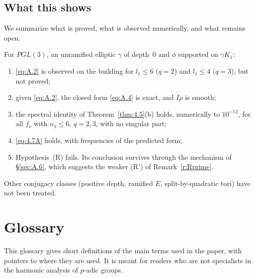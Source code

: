 \documentclass[12pt,letterpaper]{article}
\numberwithin{equation}{section}
\theoremstyle{plain}
\theoremstyle{remark}
\theoremstyle{plain}
\theoremstyle{definition}
\theoremstyle{remark}
\theoremstyle{remark}
\begin{document}
\subsection{What this shows}\label{sec:A.7}

We summarize what is proved, what is observed numerically, and what remains open.


For $PGL(3)$, an unramified elliptic $\gamma$ of depth~$0$ and $\phi$ supported on $\gamma K_1$:
\begin{enumerate}
\item \eqref{eq:A.2} is observed on the building for $l_1\le6$ ($q=2$) and $l_1\le4$ ($q=3$), but not proved;
\item given \eqref{eq:A.2}, the closed form \eqref{eq:A.4} is exact, and $I\rho$ is smooth;
\item the spectral identity of Theorem~\ref{thm:4.5}(b) holds, numerically to $10^{-12}$, for all $f_\nu$ with $n_1\le6$, $q=2,3$, with no singular part;
\item \eqref{eq:4.7A} holds, with frequencies of the predicted form;
\item Hypothesis~(R) fails. Its conclusion survives through the mechanism of \S\ref{sec:A.6}, which suggests the weaker (R$'$) of Remark~\ref{r:Rprime}.
\end{enumerate}
Other conjugacy classes (positive depth, ramified $E$, split-by-quadratic tori) have not been treated.

\section*{Glossary}\label{sec:glossary}

This glossary gives short definitions of the main terms used in the paper, with pointers to where they are used. It is meant for readers who are not specialists in the harmonic analysis of $p$-adic groups.
\end{document}
